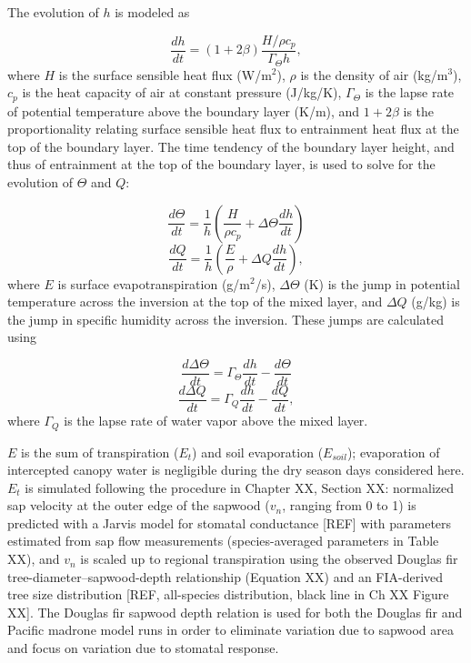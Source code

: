 The evolution of $h$ is modeled as

\begin{equation}
\frac{dh}{dt} = (1+2\beta)\frac{H/\rho c_p}{\Gamma_\Theta h},
\label{eqn:dhdt}
\end{equation}
where $H$ is the surface sensible heat flux (W/m$^2$), $\rho$ is the density of air (kg/m$^3$), $c_p$ is the heat capacity of air at constant pressure (J/kg/K), $\Gamma_\Theta$ is the lapse rate of potential temperature above the boundary layer (K/m), and $1+2\beta$ is the proportionality relating surface sensible heat flux to entrainment heat flux at the top of the boundary layer.  The time tendency of the boundary layer height, and thus of entrainment at the top of the boundary layer, is used to solve for the evolution of $\Theta$ and $Q$:

\begin{equation}
\frac{d\Theta}{dt} = \frac{1}{h}\left(\frac{H}{\rho c_p}+\Delta\Theta\frac{dh}{dt}\right)
\label{eqn:dTdt}
\end{equation}
\begin{equation}
\frac{dQ}{dt} = \frac{1}{h}\left(\frac{E}{\rho}+\Delta Q \frac{dh}{dt}\right),
\label{eqn:dQdt}
\end{equation}
where $E$ is surface evapotranspiration (g/m$^2$/s), $\Delta\Theta$ (K) is the jump in potential temperature across the inversion at the top of the mixed layer, and $\Delta Q$ (g/kg) is the jump in specific humidity across the inversion.  These jumps are calculated using

\begin{equation}
\frac{d\Delta\Theta}{dt} = \Gamma_\Theta\frac{dh}{dt}-\frac{d\Theta}{dt}
\label{eqn:dDTdt}
\end{equation}
\begin{equation}
\frac{d\Delta Q}{dt} = \Gamma_Q\frac{dh}{dt}-\frac{dQ}{dt},
\label{eqn:dDQdt}
\end{equation}
where $\Gamma_Q$ is the lapse rate of water vapor above the mixed layer.

$E$ is the sum of transpiration ($E_t$) and soil evaporation ($E_{soil}$); evaporation of intercepted canopy water is negligible during the dry season days considered here.  $E_t$ is simulated following the procedure in Chapter XX, Section XX: normalized sap velocity at the outer edge of the sapwood ($v_n$, ranging from 0 to 1) is predicted with a Jarvis model for stomatal conductance [REF] with parameters estimated from sap flow measurements (species-averaged parameters in Table XX), and $v_n$ is scaled up to regional transpiration using the observed Douglas fir tree-diameter--sapwood-depth relationship (Equation XX) and an FIA-derived tree size distribution [REF, all-species distribution, black line in Ch XX Figure XX].  The Douglas fir sapwood depth relation is used for both the Douglas fir and Pacific madrone model runs in order to eliminate variation due to sapwood area and focus on variation due to stomatal response.

